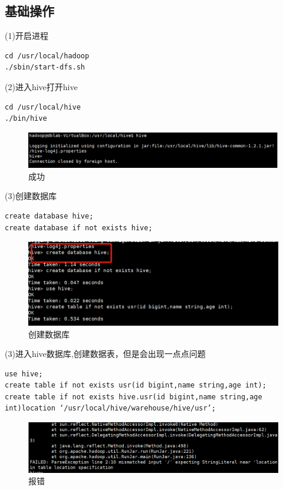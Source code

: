 \documentclass[12pt]{article}
\begin{document}
\subsection{基础操作}

(1)开启进程
\begin{lstlisting}[language={[ANSI]C}]
cd /usr/local/hadoop
./sbin/start-dfs.sh
\end{lstlisting}
(2)进入hive打开hive
\begin{lstlisting}[language={[ANSI]C}]
cd /usr/local/hive
./bin/hive
\end{lstlisting}

\begin{figure}[ht]
\centering
\includegraphics[scale=0.8]{figures/9.png}
\caption{成功}\label{fig:label2}
\end{figure}

(3)创建数据库
\begin{lstlisting}[language={[ANSI]C}]
create database hive;
create database if not exists hive;
\end{lstlisting}

\begin{figure}[ht]
\centering
\includegraphics[scale=0.9]{figures/10.png}
\caption{创建数据库}\label{fig:label2}
\end{figure}

\newpage
(3)进入hive数据库,创建数据表，但是会出现一点点问题
\begin{lstlisting}[language={[ANSI]C}]
use hive;
create table if not exists usr(id bigint,name string,age int);
create table if not exists hive.usr(id bigint,name string,age int)location ‘/usr/local/hive/warehouse/hive/usr’;
\end{lstlisting}

\begin{figure}[ht]
\centering
\includegraphics[scale=0.9]{figures/11.png}
\caption{报错}\label{fig:label2}
\end{figure}
\end{document}
